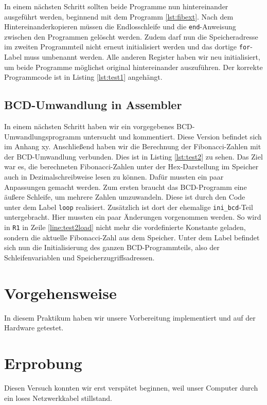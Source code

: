 \documentclass[12pt,a4paper]{scrartcl}
\begin{document}
In einem n\"achsten Schritt sollten beide Programme nun hintereinander ausgef\"uhrt werden, beginnend mit dem Programm \ref{lst:fibext}.
Nach dem Hintereinanderkopieren m\"ussen die Endlosschleife und die \texttt{end}-Anweisung zwischen den Programmen gel\"oscht werden.
Zudem darf nun die Speicheradresse im zweiten Programmteil nicht erneut initialisiert werden und das dortige \texttt{for}-Label muss umbenannt werden.
Alle anderen Register haben wir neu initialisiert, um beide Programme m\"oglichst original hintereinander auszuf\"uhren.
Der korrekte Programmcode ist in Listing \ref{lst:test1} angeh\"angt.

\subsection*{BCD-Umwandlung in Assembler}
In einem n\"achsten Schritt haben wir ein vorgegebenes BCD-Umwandlungsprogramm untersucht und kommentiert.
Diese Version befindet sich im Anhang xy.
Anschlie\ss{}end haben wir die Berechnung der Fibonacci-Zahlen mit der BCD-Umwandlung verbunden.
Dies ist in Listing \ref{lst:test2} zu sehen.
Das Ziel war es, die berechneten Fibonacci-Zahlen unter der Hex-Darstellung im Speicher auch in Dezimalschreibweise lesen zu k\"onnen.
Daf\"ur mussten ein paar Anpassungen gemacht werden.
Zum ersten braucht das BCD-Programm eine \"au\ss{}ere Schleife, um mehrere Zahlen umzuwandeln.
Diese ist durch den Code unter dem Label \texttt{loop} realisiert.
Zus\"atzlich ist dort der ehemalige \texttt{ini\_bcd}-Teil untergebracht.
Hier mussten ein paar \"Anderungen vorgenommen werden.
So wird in \texttt{R1} in Zeile \ref{line:test2load} nicht mehr die vordefinierte Konstante geladen, sondern die aktuelle Fibonacci-Zahl aus dem Speicher.
Unter dem Label befindet sich nun die Initialisierung des ganzen BCD-Programmteils, also der Schleifenvariablen und Speicherzugriffsadressen.

\section{Vorgehensweise}
In diesem Praktikum haben wir unsere Vorbereitung implementiert und auf der Hardware getestet.

\section{Erprobung}
Diesen Versuch konnten wir erst versp\"atet beginnen, weil unser Computer durch ein loses Netzwerkkabel stillstand.
\end{document}
